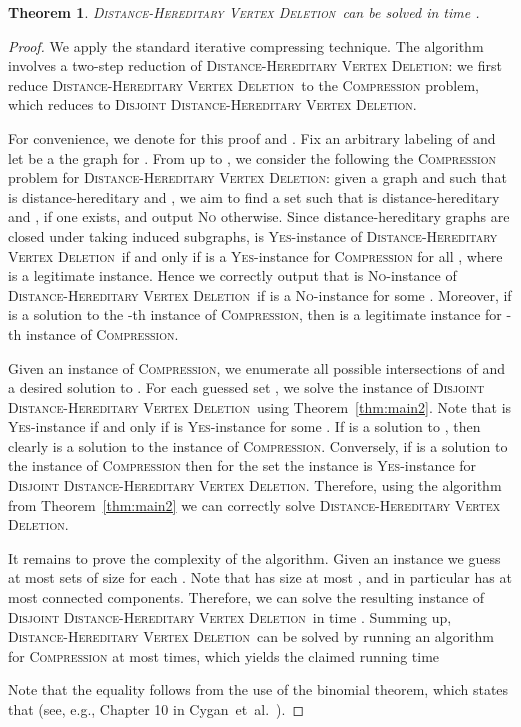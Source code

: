 \documentclass[11pt]{elsarticle}
\newtheorem{theorem}{Theorem}[section]
\newcommand{\DHVD}{\textsc{Distance-Hereditary Vertex Deletion}}
\newcommand{\disjointDHVD}{\textsc{Disjoint Distance-Hereditary Vertex Deletion}}
\begin{document}
\begin{theorem}
\label{thm:main}
\DHVD\ can be solved in time .
\end{theorem}
\begin{proof}
We apply the standard iterative compressing technique. The algorithm involves a two-step reduction of \DHVD: we first reduce \DHVD\ to the \textsc{Compression} problem, which reduces to
\disjointDHVD. 

For convenience, we denote for this proof  and .
Fix an arbitrary labeling  of  and let  be a the graph  for . From  up to , we consider the following the \textsc{Compression} problem for \DHVD: given a graph  and  such that  is distance-hereditary and , we aim to find a set  such that  is distance-hereditary and , if one exists, and output \textsc{No} otherwise. Since distance-hereditary graphs are closed under taking induced subgraphs,  is \textsc{Yes}-instance of \DHVD\ if and only if  is a \textsc{Yes}-instance for 
\textsc{Compression} for all , where  is a legitimate instance. Hence we correctly output that  is \textsc{No}-instance of \DHVD\ if  is a  \textsc{No}-instance for some . Moreover, if  is a solution to the -th instance of  \textsc{Compression}, then  is a legitimate instance for -th
instance of  \textsc{Compression}. 

Given an instance  of \textsc{Compression}, we enumerate all possible intersections  of  and a desired solution to . For each guessed set , we solve the instance  of \disjointDHVD\ using Theorem~\ref{thm:main2}. Note that   is \textsc{Yes}-instance if and only if   is \textsc{Yes}-instance for some . If  is a solution to  , then clearly  is a solution to the instance  of \textsc{Compression}. Conversely, if  is a solution to  the instance  of \textsc{Compression} then for the set  the instance  is  \textsc{Yes}-instance for \disjointDHVD. Therefore, using the algorithm from Theorem~\ref{thm:main2} we can correctly solve \DHVD.

It remains to prove the complexity of the algorithm. Given an instance  we guess at most  sets  of size  for each . Note that  has size at most , and in particular  has at most  connected components. Therefore, we can solve the resulting instance  of \disjointDHVD\ in time . Summing up, \DHVD\ can be solved by running an algorithm for \textsc{Compression} at most  times, which yields the claimed running time 

Note that the equality follows from the use of the binomial theorem, which states that  (see, e.g., Chapter 10 in Cygan~et~al.~\cite{CyganFKLMPPS15}).
\end{proof}
\end{document}
